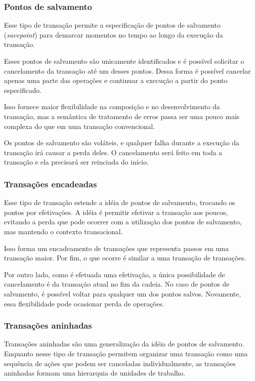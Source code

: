 \documentclass[11pt,twoside,a4paper]{book}
\begin{document}
\subsubsection*{Pontos de salvamento}
Esse tipo de transação permite a especificação de pontos de salvamento (\emph{savepoint}) para demarcar momentos no tempo ao longo da execução da transação.

Esses pontos de salvamento são unicamente identificados e é possível solicitar o cancelamento da transação até um desses pontos. Dessa forma é possível cancelar apenas uma parte das operações e continuar a execução a partir do ponto especificado.

Isso fornece maior flexibilidade na composição e no desenvolvimento da transação, mas a semântica de tratamento de erros passa ser uma pouco mais complexa do que em uma transação convencional.

Os pontos de salvamento são voláteis, e qualquer falha durante a execução da transação irá causar a perda deles. O cancelamento será feito em toda a transação e ela precisará ser reinciada do início.

\subsubsection*{Transações encadeadas}
Esse tipo de transação estende a idéia de pontos de salvamento, trocando os pontos por efetivações. A idéia é permitir efetivar a transação aos poucos, evitando a perda que pode ocorrer com a utilização dos pontos de salvamento, mas mantendo o contexto transacional.

Isso forma um encadeamento de transações que representa passos em uma transação maior. Por fim, o que ocorre é similar a uma transação de transações.

Por outro lado, como é efetuada uma efetivação, a única possibilidade de cancelamento é da transação atual no fim da cadeia. No caso de pontos de salvamento, é possível voltar para qualquer um dos pontos salvos. Novamente, essa flexibilidade pode ocasionar perda de operações.

\subsubsection*{Transações aninhadas}
Transações aninhadas são uma generalização da idéia de pontos de salvamento. Enquanto nesse tipo de transação permitem organizar uma transação como uma sequência de ações que podem ser canceladas individualmente, as transações aninhadas formam uma hierarquia de unidades de trabalho.
\end{document}
